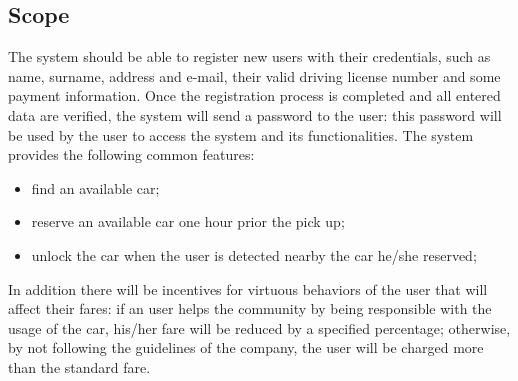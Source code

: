 \documentclass[10pt, a4paper,titlepage]{article}
\begin{document}
\subsection{Scope}
The system should be able to register new users with their credentials, such as name, surname, address and e-mail, their valid driving license number and some payment information. Once the registration process is completed and all entered data are verified, the system will send a password to the user: this password will be used by the user to access the system and its functionalities.
The system provides the following common features:
\begin{itemize}
\item find an available car;
\item reserve an available car one hour prior the pick up;
\item unlock the car when the user is detected nearby the car he/she reserved;
\end{itemize}
In addition there will be incentives for virtuous behaviors of the user that will affect their fares: if an user helps the community by being responsible with the usage of the car, his/her fare will be reduced by a specified percentage; otherwise, by not following the guidelines of the company, the user will be charged more than the standard fare.
\end{document}
